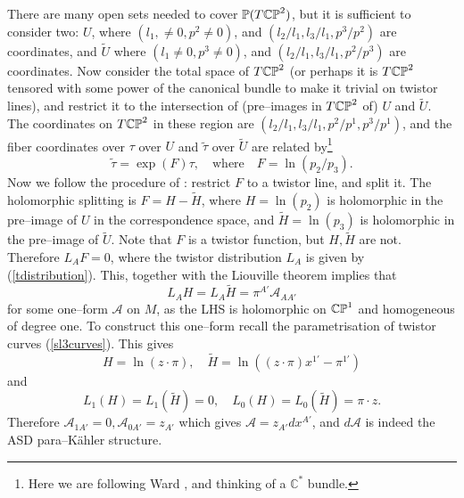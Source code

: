 There are many open sets needed to cover
$\mathbb{P}(T\mathbb{CP}^2)$, but it is sufficient to consider two:
$U$, where $(l_1, \neq 0, p^2\neq 0)$, and $(l_2/l_1, l_3/l_1, p^3/p^2)$ are coordinates, and $\widetilde{U}$ where
$(l_1\neq 0, p^3\neq 0)$, and  $(l_2/l_1, l_3/l_1, p^2/p^3)$
are coordinates. Now consider the total
space of $T\mathbb{CP}^2$ (or perhaps it is $T\mathbb{CP}^2$ tensored
with some power of the canonical bundle to make it trivial on twistor
lines), and restrict it to the intersection of (pre--images in
$T\mathbb{CP}^2$
of) $U$ and $\widetilde{U}$. The coordinates on $T\mathbb{CP}^2$ in these
region are $(l_2/l_1, l_3/l_1, p^2/p^1, p^3/p^1)$, and the fiber
coordinates over $\tau$ over $U$ and $\tilde{\tau}$ over 
$\widetilde{U}$ are related by\footnote{Here we are following Ward \cite{wardtf},
and thinking of a $\mathbb{C}^*$ bundle.}
\[
\tilde \tau=\exp(F)\tau, \quad\mbox{where}\quad  
F=\ln{(p_2/p_3)}.
\]
Now we follow the procedure of \cite{wardtf}: restrict $F$ to a twistor line,
and split it.
The holomorphic splitting is $F=H-\widetilde{H}$, where
$H=\ln{(p_2)}$ is holomorphic in the pre--image of $U$ in the correspondence space, and 
$\widetilde{H}=\ln{(p_3)}$ is holomorphic in the pre--image of
$\widetilde{U}$. Note that $F$ is a twistor  function, but 
$H, \widetilde{H}$ are not. Therefore
$L_{A}F=0$, where the twistor distribution $L_{A}$
is given by (\ref{tdistribution}). This, 
together with the Liouville theorem
implies
that
\[
L_{A}H=L_{A}\widetilde{H}=\pi^{A'}\mathcal{A}_{AA'}
\]
for some one--form $\mathcal{A}$ on $M$, 
as the LHS is holomorphic on  $\mathbb{CP}^1$ and homogeneous of degree
one. To construct this one--form recall the parametrisation
of twistor curves (\ref{sl3curves}). This gives
\[
H=\ln{(z\cdot\pi)}, \quad\widetilde{H}=\ln{((z\cdot\pi)x^{1'}-\pi^{1'})}
\]
and
\[
L_{1}(H)=L_{1}(\widetilde{H})=0, \quad
L_{0}(H)=L_{0}(\widetilde{H})=\pi\cdot z.
\]
Therefore ${\mathcal A}_{1A'}=0, {\mathcal A}_{0A'}=z_{A'}$
which gives ${\mathcal A}=z_{A'}dx^{A'}$, and $d{\mathcal A}$
is indeed the ASD para--K\"ahler structure.
